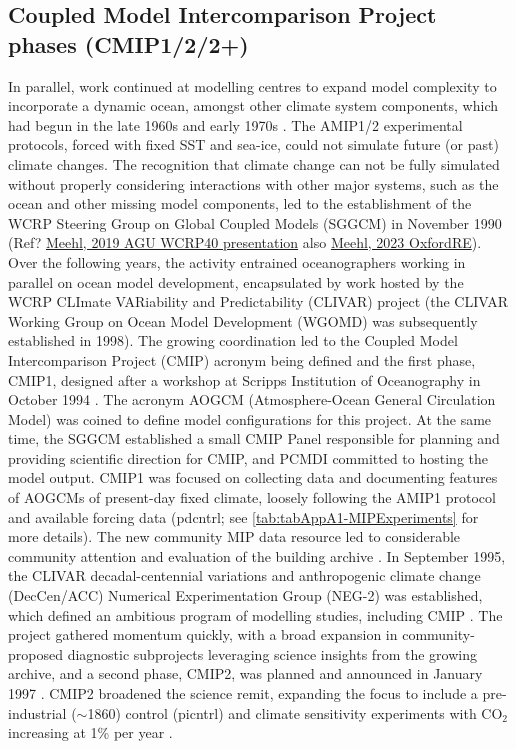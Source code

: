 \documentclass[gmd, preprint]{copernicus}
\def\cred#1{{\color{red}#1}}
\begin{document}
\subsection{Coupled Model Intercomparison Project phases (CMIP1/2/2+)}
\label{sec:cmip1And2And2Plus}
In parallel, work continued at modelling centres to expand model complexity to incorporate a dynamic ocean, amongst other climate system components, which had begun in the late 1960s and early 1970s \citep[e.g.,][]{manabe_climate_1969-1,manabe_global_1975,bryan_global_1975}. The AMIP1/2 experimental protocols, forced with fixed SST and sea-ice, could not simulate future (or past) climate changes. The recognition that climate change can not be fully simulated without properly considering interactions with other major systems, such as the ocean and other missing model components, led to the establishment of the WCRP Steering Group on Global Coupled Models (SGGCM) in November 1990 (\cred{Ref? \href{https://www.wcrp-climate.org/images/AGU2019/presentations/Symposium/11-Meehl_WCRP40.pdf}{Meehl, 2019 AGU WCRP40 presentation} also \href{https://doi.org/10.1093/acrefore/9780190228620.013.933}{Meehl, 2023 OxfordRE}}). Over the following years, the activity entrained oceanographers working in parallel on ocean model development, encapsulated by work hosted by the WCRP CLImate VARiability and Predictability (CLIVAR) project (the CLIVAR Working Group on Ocean Model Development (WGOMD) was subsequently established in 1998). The growing coordination led to the Coupled Model Intercomparison Project (CMIP) acronym being defined and the first phase, CMIP1, designed after a workshop at Scripps Institution of Oceanography in October 1994 \citep{meehl_global_1995}. The acronym AOGCM (Atmosphere-Ocean General Circulation Model) was coined to define model configurations for this project. At the same time, the SGGCM established a small CMIP Panel responsible for planning and providing scientific direction for CMIP, and PCMDI committed to hosting the model output. CMIP1 was focused on collecting data and documenting features of AOGCMs of present-day fixed climate, loosely following the AMIP1 protocol and available forcing data (pdcntrl; see \autoref{tab:tabAppA1-MIPExperiments} for more details). The new community MIP data resource led to considerable community attention and evaluation of the building archive \citep{villwock_6th_2003, lambert_cmip1_2001, raisanen_co2-induced_2001}. In September 1995, the CLIVAR decadal-centennial variations and anthropogenic climate change (DecCen/ACC) Numerical Experimentation Group (NEG-2) was established, which defined an ambitious program of modelling studies, including CMIP \citep{villwock_what_1996, coughlan_report_1996}. The project gathered momentum quickly, with a broad expansion in community-proposed diagnostic subprojects leveraging science insights from the growing archive, and a second phase, CMIP2, was planned and announced in January 1997 \citep{meehl_intercomparison_1997, meehl_coupled_2000}. CMIP2 broadened the science remit, expanding the focus to include a pre-industrial ($\sim$1860) control (picntrl) and climate sensitivity experiments with CO$_{2}$ increasing at 1\% per year \citep[1pctto2x, 1pctto4x;][]{villwock_6th_2003, meehl_cmip_2003}. 
\end{document}
